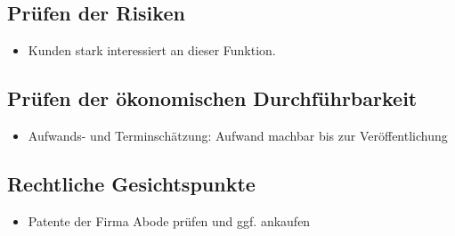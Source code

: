 \documentclass[parskip=full]{scrartcl}
\begin{document}
\subsection{Prüfen der Risiken}
\begin{itemize}
	\item Kunden stark interessiert an dieser Funktion.
\end{itemize}
\subsection{Prüfen der ökonomischen Durchführbarkeit}
\begin{itemize}
	\item Aufwands- und Terminschätzung: Aufwand machbar bis zur Veröffentlichung
\end{itemize}
\subsection{Rechtliche Gesichtspunkte}
\begin{itemize}
	\item Patente der Firma Abode prüfen und ggf. ankaufen
\end{itemize}
\end{document}

